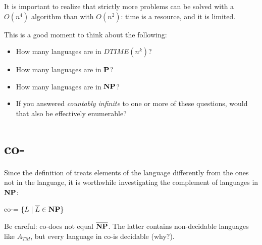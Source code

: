 It is important to realize that strictly more problems can be solved
with a $O(n^4)$ algorithm than with $O(n^2)$: time is a resource, and
it is limited.
\begin{exercise}
This is a good moment to think about the following:
\begin{itemize}
	\item How many languages are in $DTIME(n^k)$?
	
	\item How many languages are in $\P$?
	
	\item How many languages are in $\NP$?
	
	\item If you answered {\em countably infinite} to one or more of these
	questions, would that also be effectively enumerable?
\end{itemize}
\end{exercise}


\section{co-\NP}

Since the definition of \NP treats elements of the language
differently from the ones not in the language, it is worthwhile
investigating the complement of languages in $\NP$:

\begin{definition}[co-\NP]
co-\NP = $\{L \mid \overline{L} \in \NP\}$
\end{definition}

Be careful: co-\NP does not equal $\overline{\NP}$. The latter
contains non-decidable languages like $A_{TM}$, but every language in
co-\NP is decidable (why?).

